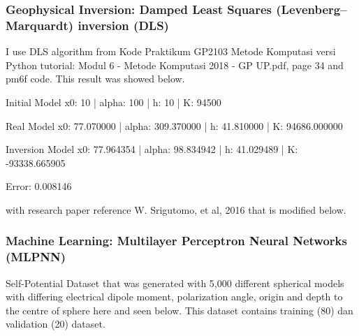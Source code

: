 \documentclass[12pt,oneside,a4paper]{article}
\begin{document}
\subsubsection{Geophysical Inversion: Damped Least Squares (Levenberg–Marquardt) inversion (DLS)}
I use DLS algorithm from Kode Praktikum GP2103 Metode Komputasi versi Python tutorial: Modul 6 - Metode Komputasi 2018 - GP UP.pdf, page 34 and pm6f code. This result was showed below.

Initial Model x0: 10 | alpha: 100 | h: 10 | K: 94500

Real Model x0: 77.070000 | alpha: 309.370000 | h: 41.810000 | K: 94686.000000

Inversion Model x0: 77.964354 | alpha: 98.834942 | h: 41.029489 | K: -93338.665905

Error: 0.008146

with research paper reference W. Srigutomo, et al, 2016 that is modified below.

\subsubsection{Machine Learning: Multilayer Perceptron Neural Networks (MLPNN)}

Self-Potential Dataset that was generated with 5,000 different spherical models with differing electrical dipole moment, polarization angle, origin and depth to the centre of sphere here and seen below. This dataset contains training (80) dan validation (20) dataset.
\end{document}
